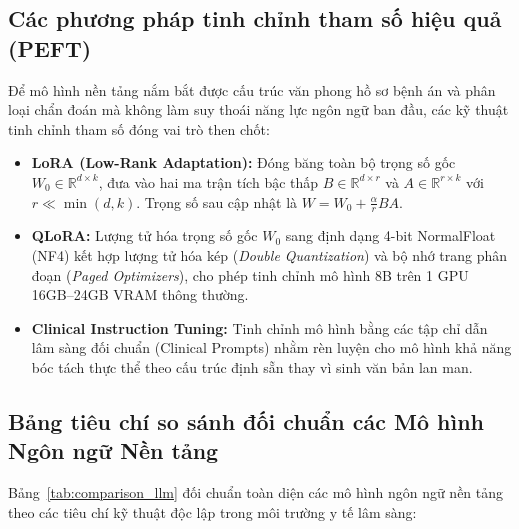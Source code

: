 \subsection{Các phương pháp tinh chỉnh tham số hiệu quả (PEFT)}
Để mô hình nền tảng nắm bắt được cấu trúc văn phong hồ sơ bệnh án và phân loại chẩn đoán mà không làm suy thoái năng lực ngôn ngữ ban đầu, các kỹ thuật tinh chỉnh tham số đóng vai trò then chốt:
\begin{itemize}
    \item \textbf{LoRA (Low-Rank Adaptation):} Đóng băng toàn bộ trọng số gốc $W_0 \in \mathbb{R}^{d \times k}$, đưa vào hai ma trận tích bậc thấp $B \in \mathbb{R}^{d \times r}$ và $A \in \mathbb{R}^{r \times k}$ với $r \ll \min(d, k)$. Trọng số sau cập nhật là $W = W_0 + \frac{\alpha}{r} BA$.
    \item \textbf{QLoRA:} Lượng tử hóa trọng số gốc $W_0$ sang định dạng 4-bit NormalFloat (NF4) kết hợp lượng tử hóa kép (\emph{Double Quantization}) và bộ nhớ trang phân đoạn (\emph{Paged Optimizers}), cho phép tinh chỉnh mô hình 8B trên 1 GPU 16GB--24GB VRAM thông thường.
    \item \textbf{Clinical Instruction Tuning:} Tinh chỉnh mô hình bằng các tập chỉ dẫn lâm sàng đối chuẩn (Clinical Prompts) nhằm rèn luyện cho mô hình khả năng bóc tách thực thể theo cấu trúc định sẵn thay vì sinh văn bản lan man.
\end{itemize}

\clearpage
\subsection{Bảng tiêu chí so sánh đối chuẩn các Mô hình Ngôn ngữ Nền tảng}

Bảng~\ref{tab:comparison_llm} đối chuẩn toàn diện các mô hình ngôn ngữ nền tảng theo các tiêu chí kỹ thuật độc lập trong môi trường y tế lâm sàng:


